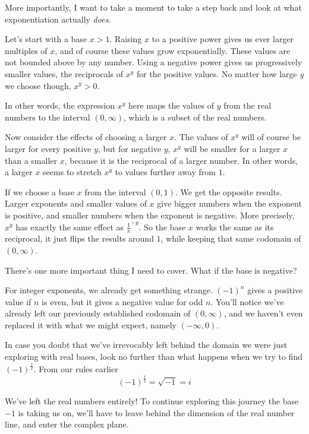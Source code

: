 \documentclass[11pt, oneside]{article}   	%
\begin{document}
More importantly, I want to take a moment to take a step back and look at what exponentiation actually \emph{does}.

Let's start with a base $x>1$. Raising $x$ to a positive power gives us ever larger multiples of $x$, and of course these values grow exponentially. These values are not bounded above by any number.
Using a negative power gives us progressively smaller values, the reciprocals of $x^y$ for the positive values. No matter how large $y$ we choose though, $x^y>0$.

In other words, the expression $x^y$ here maps the values of $y$ from the real numbers to the interval $(0,\infty)$, which is a subset of the real numbers.

Now consider the effects of choosing a larger $x$. The values of $x^y$ will of course be larger for every positive $y$, but for negative $y$, $x^y$ will be smaller for a larger $x$ than a smaller $x$, because it is the reciprocal of a larger number. In other words, a larger $x$ seems to stretch $x^y$ to values further away from $1$.

If we choose a base $x$ from the interval $(0,1)$. We get the opposite results. Larger exponents and smaller values of $x$ give bigger numbers when the exponent is positive, and smaller numbers when the exponent is negative. More precisely, $x^y$ has exactly the same effect as $\frac{1}{x}^{-y}$.
So the base $x$ works the same as its reciprocal, it just flips the results around $1$, while keeping that same codomain of $(0,\infty)$.

There's one more important thing I need to cover. What if the base is negative?

For integer exponents, we already get something strange. $(-1)^n$ gives a positive value if $n$ is even, but it gives a negative value for odd $n$. You'll notice we've already left our previously established codomain of $(0,\infty)$, and we haven't even replaced it with what we might expect, namely $(-\infty,0)$.

In case you doubt that we've irrevocably left behind the domain we were just exploring with real bases, look no further than what happens when we try to find $(-1)^\frac{1}{2}$.
From our rules earlier \[(-1)^\frac{1}{2} = \sqrt{-1} = i\]

We've left the real numbers entirely!
To continue exploring this journey the base $-1$ is taking us on, we'll have to leave behind the dimension of the real number line, and enter the complex plane.
\end{document}
